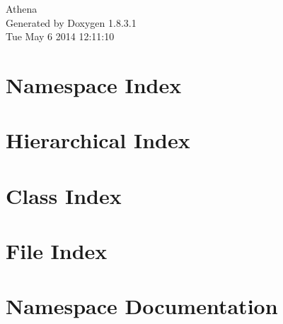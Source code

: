 \documentclass{book}
\begin{document}
\hypersetup{pageanchor=false,citecolor=blue}
\begin{titlepage}
\vspace*{7cm}
\begin{center}
{\Large Athena }\\
\vspace*{1cm}
{\large Generated by Doxygen 1.8.3.1}\\
\vspace*{0.5cm}
{\small Tue May 6 2014 12:11:10}\\
\end{center}
\end{titlepage}
\clearemptydoublepage
{}
\tableofcontents
\clearemptydoublepage
{}
\hypersetup{pageanchor=true,citecolor=blue}
\chapter{Namespace Index}

\chapter{Hierarchical Index}

\chapter{Class Index}

\chapter{File Index}

\chapter{Namespace Documentation}












\end{document}
